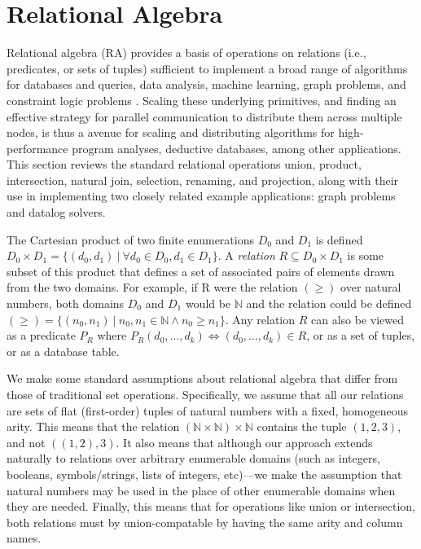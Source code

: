 

\section{Relational Algebra}
\label{sec:ra}
%
Relational algebra (RA) provides a basis of operations on relations (i.e., predicates, or sets of tuples) sufficient to implement a broad range of algorithms for databases and queries, data analysis, machine learning, graph problems, and constraint logic problems \cite{}. Scaling these underlying primitives, and finding an effective strategy for parallel communication to distribute them across multiple nodes, is thus a avenue for scaling and distributing algorithms for high-performance program analyses, deductive databases, among other applications. This section reviews the standard relational operations union, product, intersection, natural join, selection, renaming, and projection, along with their use in implementing two closely related example applications: graph problems and datalog solvers.

The Cartesian product of two finite enumerations $D_0$ and $D_1$ is defined $D_0 \times D_1 = \{ (d_0, d_1) \ |\ \forall d_0 \in D_0, d_1 \in D_1 \}$. A \textit{relation} $R \subseteq D_0 \times D_1$ is some subset of this product that defines a set of associated pairs of elements drawn from the two domains. For example, if R were the relation $(\geq)$ over natural numbers, both domains $D_0$ and $D_1$ would be $\mathbb{N}$ and the relation could be defined $(\geq) = \{ (n_0, n_1) \ |\ n_0, n_1 \in \mathbb{N} \wedge n_0 \geq n_1 \}$. Any relation $R$ can also be viewed as a predicate $P_R$ where $P_R(d_0, \ldots, d_k) \iff (d_0, \ldots, d_k) \in R$, or as a set of tuples, or as a database table.

We make some standard assumptions about relational algebra that differ from those of traditional set operations. Specifically, we assume that all our relations are sets of flat (first-order) tuples of natural numbers with a fixed, homogeneous arity. This means that the relation $(\mathbb{N} \times \mathbb{N}) \times \mathbb{N}$ contains the tuple $(1,2,3)$, and not $((1,2),3)$. It also means that although our approach extends naturally to relations over arbitrary enumerable domains (such as integers, booleans, symbols/strings, lists of integers, etc)---we make the assumption that natural numbers may be used in the place of other enumerable domains when they are needed. Finally, this means that for operations like union or intersection, both relations must by union-compatable by having the same arity and column names.    

